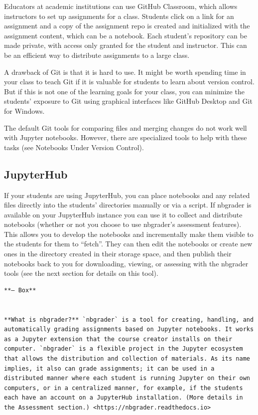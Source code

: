 \documentclass[]{book}
\begin{document}
Educators at academic institutions can use GitHub Classroom, which
allows instructors to set up assignments for a class. Students click on
a link for an assignment and a copy of the assignment repo is created
and initialized with the assignment content, which can be a notebook.
Each student's repository can be made private, with access only granted
for the student and instructor. This can be an efficient way to
distribute assignments to a large class.

A drawback of Git is that it is hard to use. It might be worth spending
time in your class to teach Git if it is valuable for students to learn
about version control. But if this is not one of the learning goals for
your class, you can minimize the students' exposure to Git using
graphical interfaces like GitHub Desktop and Git for Windows.

The default Git tools for comparing files and merging changes do not
work well with Jupyter notebooks. However, there are specialized tools
to help with these tasks (see Notebooks Under Version Control).

\subsection{JupyterHub}\label{jupyterhub}

If your students are using JupyterHub, you can place notebooks and any
related files directly into the students' directories manually or via a
script. If nbgrader is available on your JupyterHub instance you can use
it to collect and distribute notebooks (whether or not you choose to use
nbgrader's assessment features). This allows you to develop the
notebooks and incrementally make them visible to the students for them
to ``fetch''. They can then edit the notebooks or create new ones in the
directory created in their storage space, and then publish their
notebooks back to you for downloading, viewing, or assessing with the
nbgrader tools (see the next section for details on this tool).

\begin{verbatim}
**— Box**


**What is nbgrader?** `nbgrader` is a tool for creating, handling, and automatically grading assignments based on Jupyter notebooks. It works as a Jupyter extension that the course creator installs on their computer. `nbgrader` is a flexible project in the Jupyter ecosystem that allows the distribution and collection of materials. As its name implies, it also can grade assignments; it can be used in a distributed manner where each student is running Jupyter on their own computers, or in a centralized manner, for example, if the students each have an account on a JupyterHub installation. (More details in the Assessment section.) <https://nbgrader.readthedocs.io>
\end{verbatim}
\end{document}
